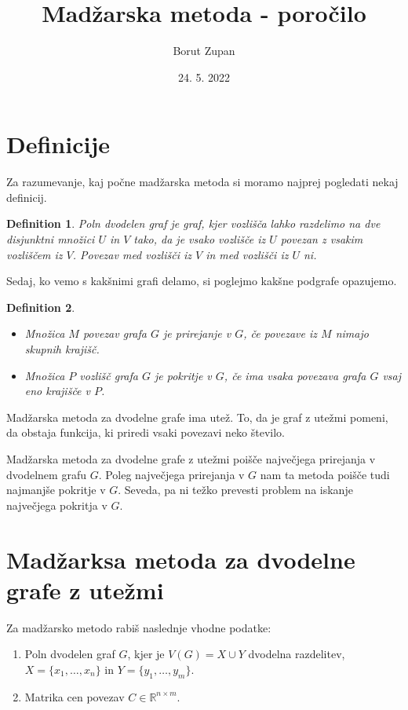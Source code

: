 \documentclass[a4paper, 12pt]{article}
\title{Madžarska metoda - poročilo}
\author{Borut Zupan}
\date{24. 5. 2022}
\newtheorem{definition}{Definition}
\begin{document}
\maketitle

\section{Definicije}
Za razumevanje, kaj počne madžarska metoda si moramo najprej pogledati nekaj definicij.
\begin{definition}
    Poln dvodelen graf je graf, kjer vozlišča lahko razdelimo
    na dve disjunktni množici $U$ in $V$ tako, da je vsako vozlišče
    iz $U$ povezan z vsakim vozliščem iz $V$. Povezav med vozlišči iz $V$
    in med vozlišči iz $U$ ni.
\end{definition}

Sedaj, ko vemo s kakšnimi grafi delamo, si poglejmo kakšne podgrafe opazujemo.

\begin{definition}
    \begin{itemize}
        \item Množica $M$ povezav grafa $G$ je prirejanje v $G$, če povezave iz $M$ nimajo skupnih krajišč. 
        \item Množica $P$ vozlišč grafa $G$ je pokritje v $G$, če ima vsaka povezava grafa $G$ vsaj eno krajišče v $P$.
    \end{itemize}
\end{definition}

Madžarska metoda za dvodelne grafe ima utež. To, da je graf z utežmi pomeni, da obstaja funkcija,
ki priredi vsaki povezavi neko število.

Madžarska metoda za dvodelne grafe z utežmi poišče največjega prirejanja v dvodelnem grafu $G$.
Poleg največjega prirejanja v $G$ nam ta metoda poišče tudi najmanjše pokritje v $G$. Seveda, pa
ni težko prevesti problem na iskanje največjega pokritja v $G$.

\section{Madžarksa metoda za dvodelne grafe z utežmi}
Za madžarsko metodo rabiš naslednje vhodne podatke:
\begin{enumerate}
    \item Poln dvodelen graf $G$, kjer je $V(G) = X \cup Y$ dvodelna razdelitev, $X = \{x_1,\ldots,x_n\}$
            in $Y = \{y_1,\ldots,y_m\}$.
    \item Matrika cen povezav $C \in \mathbb{R}^{n\times m}$.
\end{enumerate}
\end{document}
